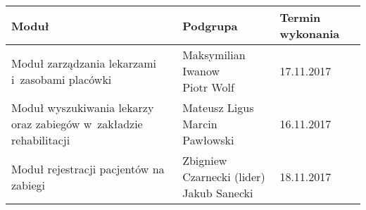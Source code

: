 \begin{tabular}{|p{7.7cm}|l|l|}
	\hline
	Moduł & Podgrupa & Termin wykonania \tabularnewline \hline
	Moduł zarządzania lekarzami i~zasobami placówki & \makecell[l]{Maksymilian Iwanow \\ Piotr Wolf} & 17.11.2017 \tabularnewline \hline
	Moduł wyszukiwania lekarzy oraz zabiegów w~zakładzie rehabilitacji & \makecell[l]{Mateusz Ligus \\ Marcin Pawłowski} & 16.11.2017 \tabularnewline \hline
	Moduł rejestracji pacjentów na zabiegi & \makecell[l]{Zbigniew Czarnecki (lider) \\ Jakub Sanecki} & 18.11.2017 \tabularnewline \hline
\end{tabular}

